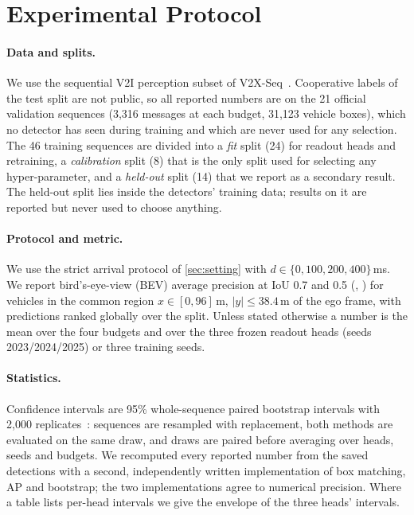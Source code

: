 \section{Experimental Protocol}
\label{sec:protocol}

\paragraph{Data and splits.}
We use the sequential V2I perception subset of V2X-Seq~\cite{yu2023v2xseq}.
Cooperative labels of the test split are not public, so all reported numbers are on the 21 official validation sequences (3,316 messages at each budget, 31,123 vehicle boxes), which no detector has seen during training and which are never used for any selection.
The 46 training sequences are divided into a \emph{fit} split (24) for readout heads and retraining, a \emph{calibration} split (8) that is the only split used for selecting any hyper-parameter, and a \emph{held-out} split (14) that we report as a secondary result.
The held-out split lies inside the detectors' training data; results on it are reported but never used to choose anything.

\paragraph{Protocol and metric.}
We use the strict arrival protocol of \cref{sec:setting} with $d\in\{0,100,200,400\}$\,ms.
We report bird's-eye-view (BEV) average precision at IoU 0.7 and 0.5 (\apseven, \apfive) for vehicles in the common region $x\in[0,96]$\,m, $|y|\le38.4$\,m of the ego frame, with predictions ranked globally over the split.
Unless stated otherwise a number is the mean over the four budgets and over the three frozen readout heads (seeds 2023/2024/2025) or three training seeds.

\paragraph{Statistics.}
Confidence intervals are 95\% whole-sequence paired bootstrap intervals with 2,000 replicates~\cite{efron1993bootstrap}: sequences are resampled with replacement, both methods are evaluated on the same draw, and draws are paired before averaging over heads, seeds and budgets.
We recomputed every reported number from the saved detections with a second, independently written implementation of box matching, AP and bootstrap; the two implementations agree to numerical precision.
Where a table lists per-head intervals we give the envelope of the three heads' intervals.

